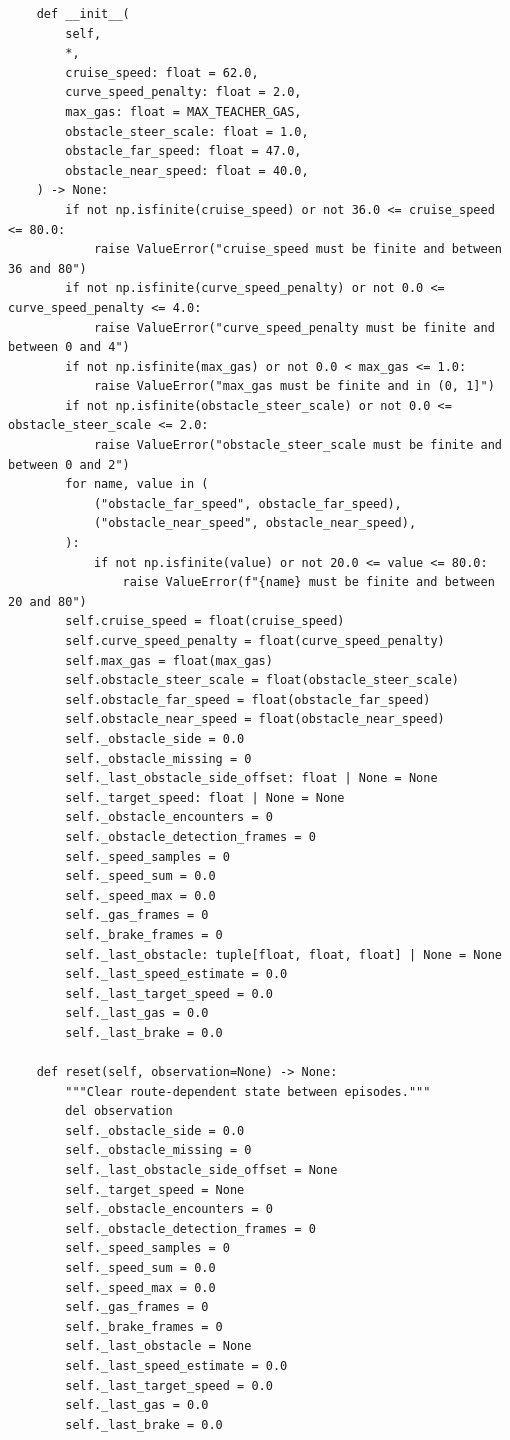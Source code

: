 \documentclass[11pt,a4paper]{article}
\begin{document}
\begin{lstlisting}
    def __init__(
        self,
        *,
        cruise_speed: float = 62.0,
        curve_speed_penalty: float = 2.0,
        max_gas: float = MAX_TEACHER_GAS,
        obstacle_steer_scale: float = 1.0,
        obstacle_far_speed: float = 47.0,
        obstacle_near_speed: float = 40.0,
    ) -> None:
        if not np.isfinite(cruise_speed) or not 36.0 <= cruise_speed <= 80.0:
            raise ValueError("cruise_speed must be finite and between 36 and 80")
        if not np.isfinite(curve_speed_penalty) or not 0.0 <= curve_speed_penalty <= 4.0:
            raise ValueError("curve_speed_penalty must be finite and between 0 and 4")
        if not np.isfinite(max_gas) or not 0.0 < max_gas <= 1.0:
            raise ValueError("max_gas must be finite and in (0, 1]")
        if not np.isfinite(obstacle_steer_scale) or not 0.0 <= obstacle_steer_scale <= 2.0:
            raise ValueError("obstacle_steer_scale must be finite and between 0 and 2")
        for name, value in (
            ("obstacle_far_speed", obstacle_far_speed),
            ("obstacle_near_speed", obstacle_near_speed),
        ):
            if not np.isfinite(value) or not 20.0 <= value <= 80.0:
                raise ValueError(f"{name} must be finite and between 20 and 80")
        self.cruise_speed = float(cruise_speed)
        self.curve_speed_penalty = float(curve_speed_penalty)
        self.max_gas = float(max_gas)
        self.obstacle_steer_scale = float(obstacle_steer_scale)
        self.obstacle_far_speed = float(obstacle_far_speed)
        self.obstacle_near_speed = float(obstacle_near_speed)
        self._obstacle_side = 0.0
        self._obstacle_missing = 0
        self._last_obstacle_side_offset: float | None = None
        self._target_speed: float | None = None
        self._obstacle_encounters = 0
        self._obstacle_detection_frames = 0
        self._speed_samples = 0
        self._speed_sum = 0.0
        self._speed_max = 0.0
        self._gas_frames = 0
        self._brake_frames = 0
        self._last_obstacle: tuple[float, float, float] | None = None
        self._last_speed_estimate = 0.0
        self._last_target_speed = 0.0
        self._last_gas = 0.0
        self._last_brake = 0.0

    def reset(self, observation=None) -> None:
        """Clear route-dependent state between episodes."""
        del observation
        self._obstacle_side = 0.0
        self._obstacle_missing = 0
        self._last_obstacle_side_offset = None
        self._target_speed = None
        self._obstacle_encounters = 0
        self._obstacle_detection_frames = 0
        self._speed_samples = 0
        self._speed_sum = 0.0
        self._speed_max = 0.0
        self._gas_frames = 0
        self._brake_frames = 0
        self._last_obstacle = None
        self._last_speed_estimate = 0.0
        self._last_target_speed = 0.0
        self._last_gas = 0.0
        self._last_brake = 0.0


\end{lstlisting}
\end{document}
